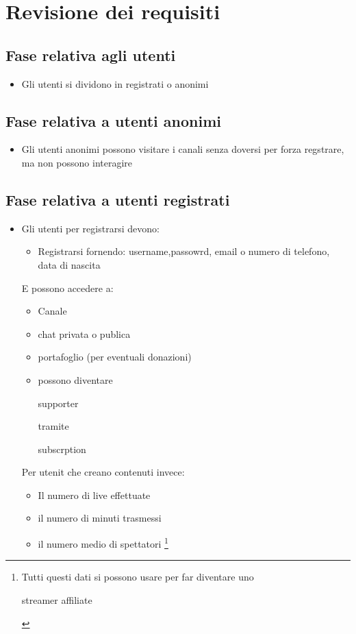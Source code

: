 \section{Revisione dei requisiti}

\subsection{Fase relativa agli utenti}
\begin{itemize}
  \item Gli utenti si dividono in registrati o anonimi
\end{itemize}

\subsection{Fase relativa a utenti anonimi}
\begin{itemize}
  \item Gli utenti anonimi possono visitare i canali senza doversi per 
  forza regstrare, ma non possono interagire 
\end{itemize}

\subsection{Fase relativa a utenti registrati}
\begin{itemize}
  \item Gli utenti per registrarsi devono:
  \begin{itemize}
    \item Registrarsi fornendo: username,passowrd, email o numero di telefono, data di nascita
  \end{itemize}
  E possono accedere a:
    \begin{itemize}
      \item Canale 
      \item chat privata o publica
      \item portafoglio (per eventuali donazioni)
      \item possono diventare \begin{italic}supporter\end{italic} tramite \begin{italic}subscrption\end{italic}
    \end{itemize} 
  Per utenit che creano contenuti invece:
    \begin{itemize}
      \item Il numero di live effettuate 
      \item il numero di minuti trasmessi
      \item il numero medio di spettatori \footnote{Tutti questi dati si possono usare per far diventare uno \begin{italic} streamer affiliate \end{italic} } %
    \end{itemize}
\end{itemize}


